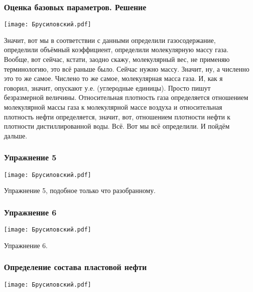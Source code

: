 \documentclass[main.tex]{subfiles}
\begin{document}
\subsubsection{Оценка базовых параметров. Решение}

\begin{center}
\texttt{[image: Брусиловский.pdf]}
\end{center}

Значит, вот мы в соответствии с данными определили газосодержание, определили объёмный коэффициент, определили молекулярную массу газа.
Вообще, вот сейчас, кстати, заодно скажу, молекулярный вес, не применяю терминологию, это всё раньше было.
Сейчас нужно массу.
Значит, ну, а численно это то же самое.
Числено то же самое, молекулярная масса газа.
И, как я говорил, значит, опускают у.е. (углеродные
единицы).
Просто пишут безразмерной величины.
Относительная плотность газа определяется отношением молекулярной массы газа к молекулярной массе воздуха и относительная плотность нефти определяется, значит, вот, отношением плотности нефти к плотности дистиллированной воды.
Всё.
Вот мы всё определили.
И пойдём дальше.

\subsubsection{Упражнение 5}

\begin{center}
\texttt{[image: Брусиловский.pdf]}
\end{center}

Упражнение 5, подобное только что разобранному.

\subsubsection{Упражнение 6}

\begin{center}
\texttt{[image: Брусиловский.pdf]}
\end{center}

Упражнение 6.

\subsubsection{Определение состава пластовой нефти}

\begin{center}
\texttt{[image: Брусиловский.pdf]}
\end{center}
\end{document}
